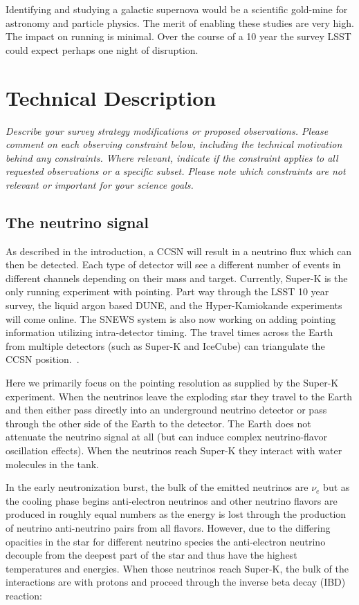 \documentclass[11pt]{article}
\newcommand{\superk}  {Super\nobreakdash-K\xspace}
\begin{document}
Identifying and studying a galactic supernova would be a scientific
gold-mine for astronomy and particle physics.  The merit of enabling
these studies are very high. The impact on running is minimal.  Over
the course of a 10 year the survey LSST could expect perhaps one night of
disruption.

\section{Technical Description}
\begin{footnotesize}
{\it Describe your survey strategy modifications or proposed observations. Please comment on each observing constraint
below, including the technical motivation behind any constraints. Where relevant, indicate
if the constraint applies to all requested observations or a specific subset. Please note which 
constraints are not relevant or important for your science goals.}
\end{footnotesize}

\subsection{The neutrino signal}
\label{sec:signal}

As described in the introduction, a CCSN will result in a neutrino
flux which can then be detected.  Each type of detector will see a
different number of events in different channels depending on their
mass and target.  Currently, \superk is the only running experiment
with pointing.  Part way through the LSST 10 year survey, the liquid
argon based DUNE, and the Hyper-Kamiokande experiments will come
online.  The SNEWS system is also now working on adding pointing
information utilizing intra-detector timing.  The travel times across
the Earth from multiple detectors (such as \superk and IceCube) can
triangulate the CCSN position.~\cite{Katepaper}.

Here we primarily focus on the pointing resolution as supplied by the
\superk experiment.  When the neutrinos leave the exploding star they
travel to the Earth and then either pass directly into an underground
neutrino detector or pass through the other side of the Earth to the
detector. The Earth does not attenuate the neutrino signal at all (but
can induce complex neutrino-flavor oscillation effects).  When the
neutrinos reach \superk they interact with water molecules in the
tank.

In the early neutronization burst, the bulk of the emitted neutrinos
are $\nu_e$ but as the cooling phase begins anti-electron neutrinos
and other neutrino flavors are produced in roughly equal numbers as
the energy is lost through the production of neutrino anti-neutrino
pairs from all flavors.  However, due to the differing opacities in
the star for different neutrino species the anti-electron neutrino
decouple from the deepest part of the star and thus have the highest
temperatures and energies.  When those neutrinos reach \superk, the
bulk of the interactions are with protons and proceed through the
inverse beta decay (IBD) reaction:
\end{document}
